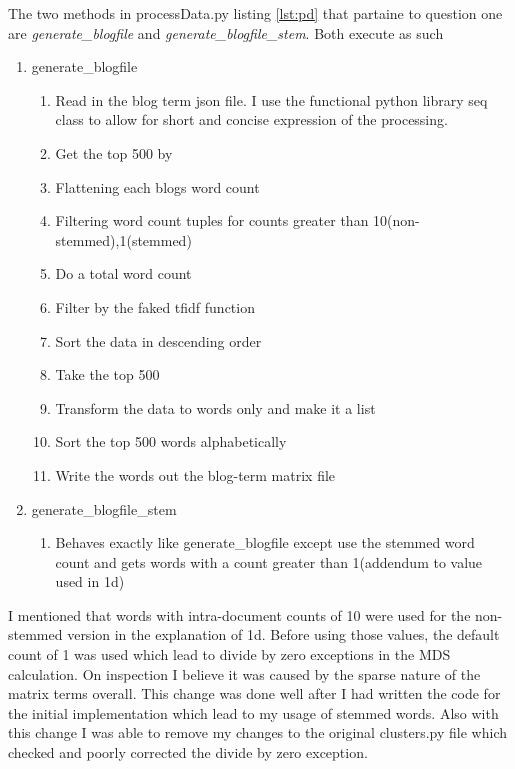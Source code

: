 \documentclass[letterpaper,10pt]{article}
\begin{document}
The two methods in processData.py listing \hyperref[lst:pf]{\ref{lst:pd}} that partaine to question one are 
\emph{generate\_blogfile} and \emph{generate\_blogfile\_stem}. Both execute as such
\begin{enumerate}
\item generate\_blogfile
\begin{enumerate}
\item Read in the blog term json file. I use the functional python library seq class to allow for short and concise expression of the processing.
\item Get the top 500 by
\item Flattening each blogs word count
\item Filtering word count tuples for counts greater than 10(non-stemmed),1(stemmed) 
\item Do a total word count
\item Filter by the faked tfidf function
\item Sort the data in descending order 
\item Take the top 500
\item Transform the data to words only and make it a list
\item Sort the top 500 words alphabetically
\item Write the words out the blog-term matrix file
\end{enumerate}
\item generate\_blogfile\_stem
\begin{enumerate}
\item Behaves exactly like generate\_blogfile except use the stemmed word count and gets words with a count greater than 1(addendum to value used in 1d)
\end{enumerate}
\end{enumerate}

I mentioned that words with intra-document counts of 10 were used for the non-stemmed version in the explanation of 1d. Before using those values, the default count of 1 was used which lead to divide by zero exceptions in the MDS calculation. On inspection I believe it was caused by the sparse nature of the matrix terms overall. This change was done well after I had written the code for the initial implementation which lead to my usage of stemmed words. Also with this change I was able to remove my changes to the original clusters.py file which checked and poorly corrected the divide by zero exception. 
 
\newpage
\clearpage
\end{document}
